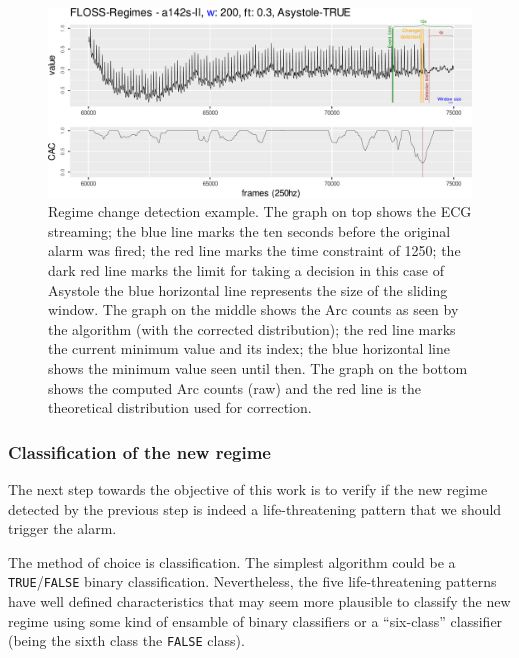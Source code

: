 \documentclass[runningheads]{llncs}
\begin{document}
\begin{figure}

{\centering \includegraphics[width=1\linewidth]{../../docs/figure/graph_regime_floss} 

}

\caption{Regime change detection example. The graph on top shows the ECG streaming; the blue line marks the ten seconds before the original alarm was fired; the red line marks the time constraint of 1250; the dark red line marks the limit for taking a decision in this case of Asystole the blue horizontal line represents the size of the sliding window. The graph on the middle shows the Arc counts as seen by the algorithm (with the corrected distribution); the red line marks the current minimum value and its index; the blue horizontal line shows the minimum value seen until then. The graph on the bottom shows the computed Arc counts (raw) and the red line is the theoretical distribution used for correction.}\label{fig:flossregime}
\end{figure}

\hypertarget{classregime}{%
\subsubsection{Classification of the new regime}\label{classregime}}

The next step towards the objective of this work is to verify if the new regime detected by the
previous step is indeed a life-threatening pattern that we should trigger the alarm.

The method of choice is classification. The simplest algorithm could be a \texttt{TRUE}/\texttt{FALSE} binary
classification. Nevertheless, the five life-threatening patterns have well defined characteristics
that may seem more plausible to classify the new regime using some kind of ensamble of binary
classifiers or a ``six-class'' classifier (being the sixth class the \texttt{FALSE} class).
\end{document}
